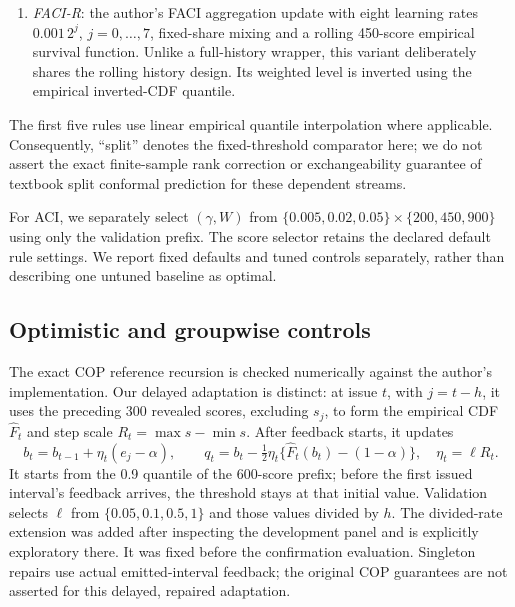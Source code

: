 \documentclass[preprint,11pt]{elsarticle}
\begin{document}
\begin{enumerate}
the author implementation \citep{bhatnagar2023saocp}, with default lifetime multiplier 8
and prefix scale $\sqrt{3}M$. The accelerated residual-score implementation agrees
numerically with an independent driver of the original expert class. For signed CQR we
remove its nonnegative projection; with delayed feedback, experts process scores in
reveal order. These are declared extensions, without transferring the original theorem
to the modified setting.
\item \emph{FACI-R}: the author's FACI aggregation update with eight learning rates
$0.001\,2^j$, $j=0,\ldots,7$, fixed-share mixing and a rolling 450-score empirical survival
function. Unlike a full-history wrapper, this variant deliberately shares the rolling
history design. Its weighted level is inverted using the empirical inverted-CDF quantile.
\end{enumerate}
The first five rules use linear empirical quantile interpolation where applicable.
Consequently, ``split'' denotes the fixed-threshold comparator here; we do not assert
the exact finite-sample rank correction or exchangeability guarantee of textbook split
conformal prediction for these dependent streams.

For ACI, we separately select $(\gamma,W)$ from
$\{0.005,0.02,0.05\}\times\{200,450,900\}$ using only the validation prefix.
The score selector retains the declared default rule settings. We report fixed defaults
and tuned controls separately, rather than describing one untuned baseline as optimal.


\subsection{Optimistic and groupwise controls}
The exact COP reference recursion is checked numerically against the author's
implementation. Our delayed adaptation is distinct: at issue $t$, with $j=t-h$,
it uses the preceding 300 revealed scores, excluding $s_j$, to form the empirical
CDF $\widehat F_t$ and step scale $R_t=\max s-\min s$. After feedback starts, it updates
\begin{equation}\label{eq:cop}
 b_t=b_{t-1}+\eta_t(e_j-\alpha),\qquad
 q_t=b_t-\tfrac12\eta_t\{\widehat F_t(b_t)-(1-\alpha)\},\quad \eta_t=\ell R_t.
\end{equation}
It starts from the 0.9 quantile of the 600-score prefix; before the first issued
interval's feedback arrives, the threshold stays at that initial value.
Validation selects $\ell$ from $\{0.05,0.1,0.5,1\}$ and those values divided by $h$.
The divided-rate extension was added after inspecting the development panel and is
explicitly exploratory there. It was fixed before the confirmation evaluation.
Singleton repairs use actual emitted-interval feedback; the original COP guarantees
are not asserted for this delayed, repaired adaptation.
\end{document}
